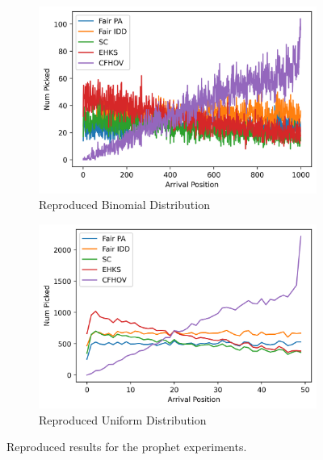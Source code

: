\begin{figure}[h!]
    \centering
    \begin{subfigure}[b]{0.475\textwidth}
         \centering
        \includegraphics[width=1\textwidth]{media/Prophetplot_bi.png}
        \caption{Reproduced Binomial Distribution}
    \end{subfigure}
    \hfill
    \begin{subfigure}[b]{0.475\textwidth}
         \centering
    \includegraphics[width=1 \linewidth]{media/Prophetplot_unif.png}
    \caption{Reproduced Uniform Distribution}
    \end{subfigure}
    \caption{Reproduced results for the prophet experiments.}
    \label{fig:propresults}
\end{figure}

